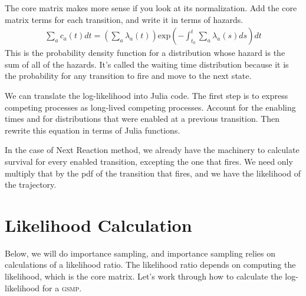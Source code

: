 \documentclass{article}
\newcommand{\gsmp}{\textsc{gsmp}\xspace}
\begin{document}
The core matrix makes more sense if you look at its normalization. Add the core matrix terms for each transition, and write it in terms of hazards.
\begin{eqnarray}
	\sum_a c_a(t)dt = \left(\sum_a \lambda_a(t)\right)\mbox{exp}\left(-\int_{t_0}^t\sum_a \lambda_a(s)ds \right)dt
\end{eqnarray}
This is the probability density function for a distribution whose hazard is the sum of all of the hazards. It's called the waiting time distribution because it is the probability for any transition to fire and move to the next state.

We can translate the log-likelihood into Julia code. The first step is to express competing processes as long-lived competing processes. Account for the enabling times and for distributions that were enabled at a previous transition. Then rewrite this equation in terms of Julia functions.

In the case of Next Reaction method, we already have the machinery to calculate survival for every enabled transition, excepting the one that fires. We need only multiply that by the pdf of the transition that fires, and we have the likelihood of the trajectory.

\section{Likelihood Calculation}

Below, we will do importance sampling, and importance sampling relies on calculations of a likelihood ratio. The likelihood ratio depends on computing the likelihood, which is the core matrix. Let's work through how to calculate the log-likelihood for a \gsmp.
\end{document}
